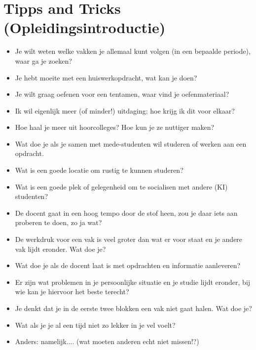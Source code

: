 \chapter{Tipps and Tricks (Opleidingsintroductie)}


\begin{itemize}

	\item Je wilt weten welke vakken je allemaal kunt volgen (in een bepaalde periode), waar ga je zoeken?

	\item Je hebt moeite met een huiswerkopdracht, wat kan je doen?

	\item Je wilt graag oefenen voor een tentamen, waar vind je oefenmateriaal?

	\item Ik wil eigenlijk meer (of minder!) uitdaging; hoe krijg ik dit voor elkaar?

	\item Hoe haal je meer uit hoorcolleges? Hoe kun je ze nuttiger maken?

	\item Wat doe je als je samen met mede-studenten wil studeren of werken aan een opdracht.

	\item Wat is een goede locatie om rustig te kunnen studeren?

	\item Wat is een goede plek of gelegenheid om te socialisen met andere (KI) studenten?

	\item De docent gaat in een hoog tempo door de stof heen, zou je daar iets aan proberen te doen, zo ja wat?

	\item De werkdruk voor een vak is veel groter dan wat er voor staat en je andere vak lijdt eronder. Wat doe je?

	\item Wat doe je als de docent laat is met opdrachten en informatie aanleveren?

	\item Er zijn wat problemen in je persoonlijke situatie en je studie lijdt eronder, bij wie kan je hiervoor het beste terecht?

	\item Je denkt dat je in de eerste twee blokken een vak niet gaat halen. Wat doe je?

	\item Wat als je je al een tijd niet zo lekker in je vel voelt?

	\item Anders: namelijk....
(wat moeten anderen echt niet missen!?)

\end{itemize}


